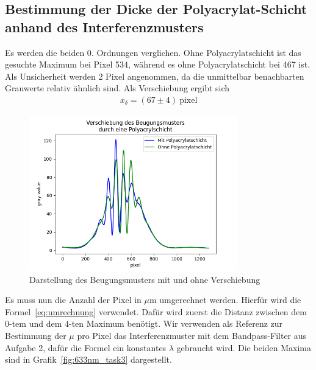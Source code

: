 \documentclass{article}
\begin{document}
\subsection{Bestimmung der Dicke der Polyacrylat-Schicht anhand des Interferenzmusters}

Es werden die beiden 0. Ordnungen verglichen. Ohne Polyacrylatschicht ist das gesuchte Maximum bei Pixel 534, während es ohne Polyacrylatschicht bei 467 ist. Als Unsicherheit werden 2 Pixel angenommen, da die unmittelbar benachbarten Grauwerte relativ ähnlich sind. Als Verschiebung ergibt sich
\begin{align*}
x_{\delta} = (67 \pm 4)~\text{pixel}
\end{align*}

\begin{figure}[H]
\centering
\caption{Darstellung des Beugungsmusters mit und ohne Verschiebung}
\includegraphics[width=9cm]{shift_noshift.png}
\end{figure}


Es muss nun die Anzahl der Pixel in $\mu$m umgerechnet werden. Hierfür wird die Formel~\eqref{eq:umrechnung} verwendet. Dafür wird zuerst die Distanz zwischen dem $0$-tem und dem $4$-ten Maximum benötigt. Wir verwenden als Referenz zur Bestimmung der $\mu$ pro Pixel das Interferenzmuster mit dem Bandpass-Filter aus Aufgabe 2, dafür die Formel ein konstantes $\lambda$ gebraucht wird. Die beiden Maxima sind in Grafik~\ref{fig:633nm_task3} dargestellt.
\end{document}
